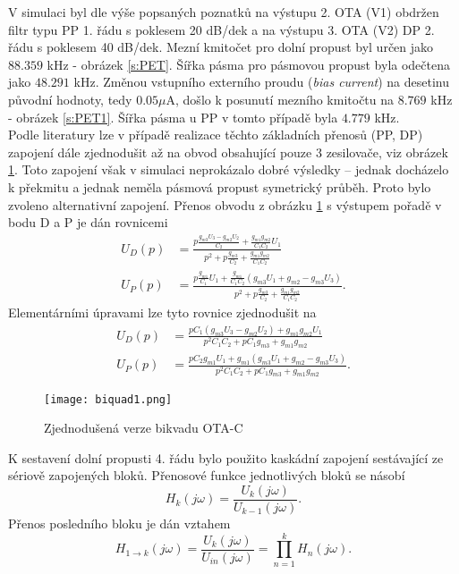 \noindent 
V simulaci byl dle výše popsaných poznatků na výstupu 2. OTA (V1) obdržen filtr typu PP 1. řádu s poklesem 20 dB/dek a na výstupu 3. OTA (V2) DP 2. řádu s poklesem 40 dB/dek. Mezní kmitočet pro dolní propust byl určen jako $88.359$ kHz - obrázek \ref{s:PET}. Šířka pásma pro pásmovou propust byla odečtena jako $48.291$ kHz. Změnou vstupního externího proudu (\textit{bias current}) na desetinu původní hodnoty, tedy $0.05 \mu$A, došlo k posunutí mezního kmitočtu na $8.769$ kHz - obrázek \ref{s:PET1}. Šířka pásma u PP v tomto případě byla $4.779$ kHz.\\
\noindent Podle literatury \cite{10} lze v případě realizace těchto základních přenosů (PP, DP) zapojení dále zjednodušit až na obvod obsahující pouze 3 zesilovače, viz obrázek \ref{s:BIK2}. Toto zapojení však v simulaci neprokázalo dobré výsledky -- jednak docházelo k překmitu a jednak neměla pásmová propust symetrický průběh. Proto bylo zvoleno alternativní zapojení. Přenos obvodu z obrázku \ref{s:BIK2} s výstupem pořadě v bodu D a P je dán rovnicemi
\begin{align}
U_D(p) &= \frac{p\frac{g_{m3}U_3-g_{m2}U_2}{C_2}+\frac{g_{m1}g_{m2}}{C_1C_2}U_1}{p^2 + p\frac{g_{m3}}{C_2} + \frac{g_{m1}g_{m2}}{C_1C_2}}\\
U_P(p) &= \frac{p\frac{g_{m1}}{C_1}U_1 + \frac{g_{m1}}{C_1C_2}(g_{m3}U_1+g_{m2}-g_{m3}U_3)}{p^2 + p\frac{g_{m3}}{C_2} + \frac{g_{m1}g_{m2}}{C_1C_2}}.
\end{align}
\noindent Elementárními úpravami lze tyto rovnice zjednodušit na
\begin{align}
U_D(p) &= \frac{pC_1(g_{m3}U_3 - g_{m2}U_2) + g_{m1}g_{m2}U_1}{p^2C_1C_2 + pC_1g_{m3} + g_{m1}g_{m2}}\\
U_P(p) &= \frac{pC_2g_{m1}U_1 + g_{m1}(g_{m3}U_1 + g_{m2} - g_{m3}U_3)}{p^2C_1C_2 + pC_1g_{m3} + g_{m1}g_{m2}}.
\end{align}
\begin{figure}[h]
\centering
\texttt{[image: biquad1.png]}
\caption[Zjednodušená verze bikvadu OTA-C]{Zjednodušená verze bikvadu OTA-C \label{s:BIK2}}
\end{figure}
\noindent K sestavení dolní propusti 4. řádu bylo použito kaskádní zapojení sestávající ze sériově zapojených bloků. Přenosové funkce jednotlivých bloků se násobí
\begin{equation}
H_k(j\omega) = \frac{U_k (j\omega)}{U_{k-1}(j\omega)}.
\end{equation}
Přenos posledního bloku je dán vztahem
\begin{equation}
H_{1 \rightarrow k}(j\omega) = \frac{U_k (j\omega)}{U_{in}(j\omega)} = \prod _{n=1}^{k} H_n(j\omega).
\end{equation}
